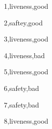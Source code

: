 \documentclass[UTF8]{ctexart}
\begin{document}
    1,liveness,good

    2,saftey,good

    3,liveness,good
    
    4,liveness,bad

    5,liveness,good

    6,safety,bad

    7,safety,bad

    8,liveness,good
\end{document}
